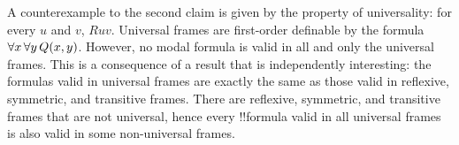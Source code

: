 \documentclass[../../../include/open-logic-section]{subfiles}
\begin{document}
A counterexample to the second claim is given by the property of
universality: for every $u$ and $v$, $Ruv$. Universal frames are
first-order definable by the formula
$\lforall[x][\lforall[y][\Atom{Q}{x,y}]]$.  However, no modal formula
is valid in all and only the universal frames. This is a consequence
of a result that is independently interesting: the formulas valid in
universal frames are exactly the same as those valid in reflexive,
symmetric, and transitive frames. There are reflexive, symmetric, and
transitive frames that are not universal, hence every !!{formula}
valid in all universal frames is also valid in some non-universal
frames.
\end{document}
